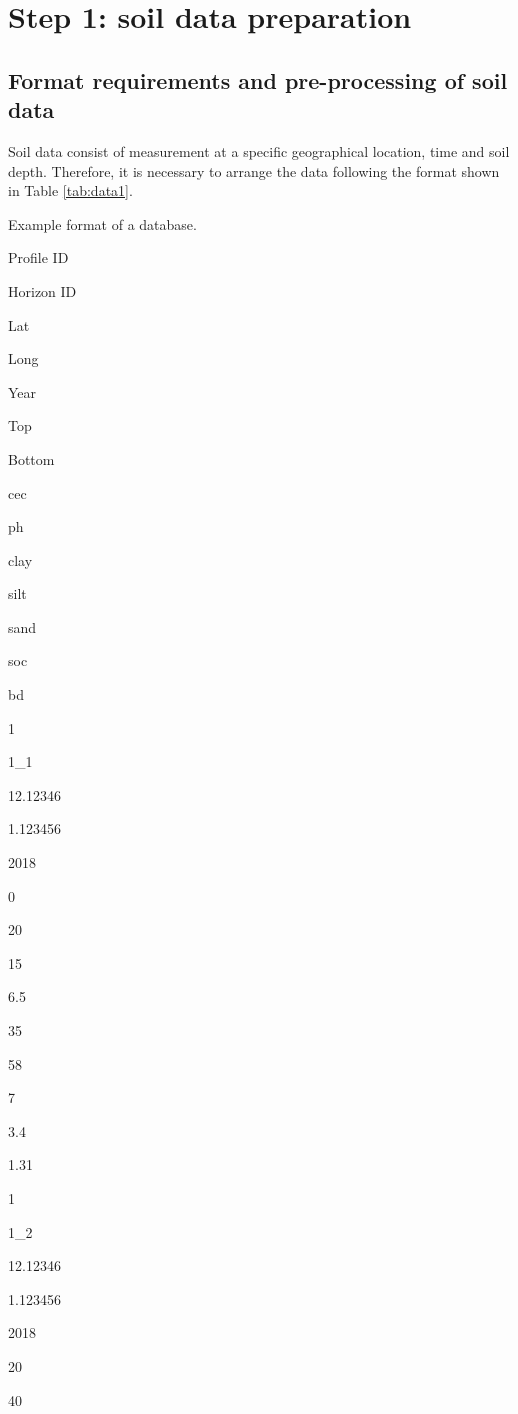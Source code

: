 \documentclass[
  10pt,
  b5paper,
  oneside]{book}
\begin{document}
\hypertarget{step-1-soil-data-preparation}{%
\chapter{Step 1: soil data preparation}\label{step-1-soil-data-preparation}}

\hypertarget{format-requirements-and-pre-processing-of-soil-data}{%
\section{Format requirements and pre-processing of soil data}\label{format-requirements-and-pre-processing-of-soil-data}}

Soil data consist of measurement at a specific geographical location, time and soil depth. Therefore, it is necessary to arrange the data following the format shown in Table \ref{tab:data1}.

\label{tab:data1}Example format of a database.

Profile ID

Horizon ID

Lat

Long

Year

Top

Bottom

cec

ph

clay

silt

sand

soc

bd

1

1\_1

12.12346

1.123456

2018

0

20

15

6.5

35

58

7

3.4

1.31

1

1\_2

12.12346

1.123456

2018

20

40
\end{document}
